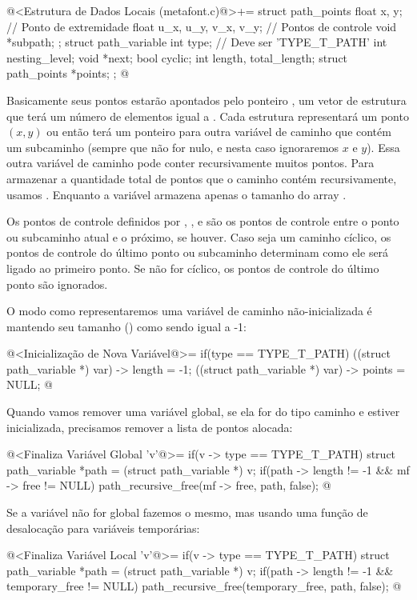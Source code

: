 \iniciocodigo
@<Estrutura de Dados Locais (metafont.c)@>+=
struct path_points{
  float x, y; // Ponto de extremidade
  float u_x, u_y, v_x, v_y;   // Pontos de controle
  void *subpath;
};
struct path_variable{
  int type; // Deve ser 'TYPE_T_PATH'
  int nesting_level;
  void *next;
  bool cyclic;
  int length, total_length;
  struct path_points *points;
};
@
\fimcodigo

Basicamente seus pontos estarão apontados pelo
ponteiro , um vetor de estrutura que terá um número
de elementos igual a . Cada estrutura representará
um ponto $(x, y)$ ou então terá um ponteiro para outra variável de
caminho que contém um subcaminho (sempre que  não
for nulo, e nesta caso ignoraremos $x$ e $y$). Essa outra variável de
caminho pode conter recursivamente muitos pontos. Para armazenar a
quantidade total de pontos que o caminho contém recursivamente,
usamos . Enquanto a
variável  armazena apenas o tamanho do
array .

Os pontos de controle definidos
por , , 
e  são os pontos de controle entre o ponto ou
subcaminho atual e o próximo, se houver. Caso seja um caminho cíclico,
os pontos de controle do último ponto ou subcaminho determinam como
ele será ligado ao primeiro ponto. Se não for cíclico, os pontos de
controle do último ponto são ignorados.

O modo como representaremos uma variável de caminho não-inicializada é
mantendo seu tamanho () como sendo igual a -1:

\iniciocodigo
@<Inicialização de Nova Variável@>=
if(type == TYPE_T_PATH){
  ((struct path_variable *) var) -> length = -1;
  ((struct path_variable *) var) -> points = NULL;
}
@
\fimcodigo

Quando vamos remover uma variável global, se ela for do tipo caminho e
estiver inicializada, precisamos remover a lista de pontos alocada:

\iniciocodigo
@<Finaliza Variável Global 'v'@>=
if(v -> type == TYPE_T_PATH){
  struct path_variable *path = (struct path_variable *) v;
  if(path -> length != -1 && mf -> free != NULL)
    path_recursive_free(mf -> free, path, false);
}
@
\fimcodigo

Se a variável não for global fazemos o mesmo, mas usando uma função de
desalocação para variáveis temporárias:


\iniciocodigo
@<Finaliza Variável Local 'v'@>=
if(v -> type == TYPE_T_PATH){
  struct path_variable *path = (struct path_variable *) v;
  if(path -> length != -1 && temporary_free != NULL)
    path_recursive_free(temporary_free, path, false);
}
@
\fimcodigo

